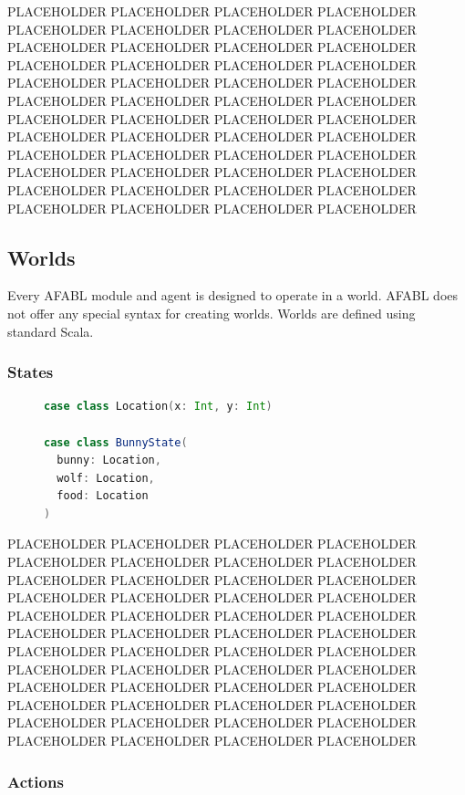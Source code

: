 PLACEHOLDER PLACEHOLDER PLACEHOLDER PLACEHOLDER PLACEHOLDER PLACEHOLDER PLACEHOLDER PLACEHOLDER PLACEHOLDER PLACEHOLDER PLACEHOLDER PLACEHOLDER PLACEHOLDER PLACEHOLDER PLACEHOLDER PLACEHOLDER PLACEHOLDER PLACEHOLDER PLACEHOLDER PLACEHOLDER PLACEHOLDER PLACEHOLDER PLACEHOLDER PLACEHOLDER PLACEHOLDER PLACEHOLDER PLACEHOLDER PLACEHOLDER PLACEHOLDER PLACEHOLDER PLACEHOLDER PLACEHOLDER PLACEHOLDER PLACEHOLDER PLACEHOLDER PLACEHOLDER PLACEHOLDER PLACEHOLDER PLACEHOLDER PLACEHOLDER PLACEHOLDER PLACEHOLDER PLACEHOLDER PLACEHOLDER PLACEHOLDER PLACEHOLDER PLACEHOLDER PLACEHOLDER

\subsection{Worlds}

Every AFABL module and agent is designed to operate in a world. AFABL does not offer any special syntax for creating worlds. Worlds are defined using standard Scala.

\subsubsection{States}

\begin{figure}[ht]
\begin{center}

\begin{lstlisting}[language=Scala]
case class Location(x: Int, y: Int)

case class BunnyState(
  bunny: Location,
  wolf: Location,
  food: Location
)
\end{lstlisting}

\caption{}
\end{center}
\label{fig:bunny-action-code}
\end{figure}


PLACEHOLDER PLACEHOLDER PLACEHOLDER PLACEHOLDER PLACEHOLDER PLACEHOLDER PLACEHOLDER PLACEHOLDER PLACEHOLDER PLACEHOLDER PLACEHOLDER PLACEHOLDER PLACEHOLDER PLACEHOLDER PLACEHOLDER PLACEHOLDER PLACEHOLDER PLACEHOLDER PLACEHOLDER PLACEHOLDER PLACEHOLDER PLACEHOLDER PLACEHOLDER PLACEHOLDER PLACEHOLDER PLACEHOLDER PLACEHOLDER PLACEHOLDER PLACEHOLDER PLACEHOLDER PLACEHOLDER PLACEHOLDER PLACEHOLDER PLACEHOLDER PLACEHOLDER PLACEHOLDER PLACEHOLDER PLACEHOLDER PLACEHOLDER PLACEHOLDER PLACEHOLDER PLACEHOLDER PLACEHOLDER PLACEHOLDER PLACEHOLDER PLACEHOLDER PLACEHOLDER PLACEHOLDER

\subsubsection{Actions}

